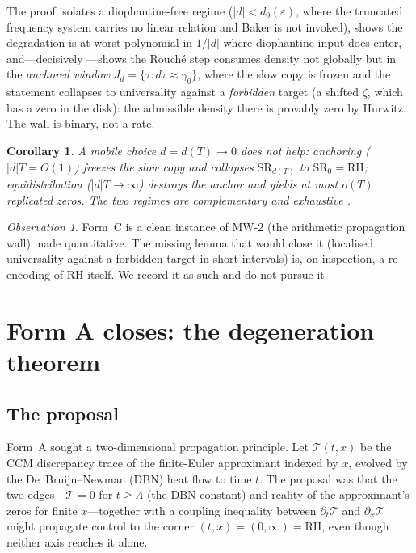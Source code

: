 \documentclass[11pt]{amsart}
\newtheorem{corollary}[theorem]{Corollary}
\theoremstyle{definition}
\theoremstyle{remark}
\newtheorem{observation}[theorem]{Observation}
\newcommand{\RH}{\mathrm{RH}}
\begin{document}
The proof \cite[]{P40} isolates a diophantine-free regime
($|d|<d_0(\varepsilon)$, where the truncated frequency system carries no
linear relation and Baker is not invoked), shows the degradation is at worst
polynomial in $1/|d|$ where diophantine input does enter, and---decisively
---shows the Rouch\'e step consumes density not globally but in the
\emph{anchored window} $J_d=\{\tau:d\tau\approx\gamma_0\}$, where the slow
copy is frozen and the statement collapses to universality against a
\emph{forbidden} target (a shifted $\zeta$, which has a zero in the disk):
the admissible density there is provably zero by Hurwitz. The wall is
binary, not a rate.

\begin{corollary}
A mobile choice $d=d(T)\to0$ does not help: anchoring
($|d|T=O(1)$) freezes the slow copy and collapses $\mathrm{SR}_{d(T)}$ to
$\mathrm{SR}_0=\RH$; equidistribution ($|d|T\to\infty$) destroys the anchor
and yields at most $o(T)$ replicated zeros. The two regimes are
complementary and exhaustive \cite[Lem.~6.1]{P40}.
\end{corollary}

\begin{observation}
Form~C is a clean instance of MW-2 (the arithmetic propagation wall) made
quantitative. The missing lemma that would close it (localised universality
against a forbidden target in short intervals) is, on inspection, a
re-encoding of RH itself. We record it as such and do not pursue it.
\end{observation}

\section{Form A closes: the degeneration theorem}\label{sec:formA}

\subsection{The proposal}
Form~A sought a two-dimensional propagation principle. Let
$\mathcal{T}(t,x)$ be the CCM discrepancy trace of the finite-Euler
approximant indexed by $x$, evolved by the De~Bruijn--Newman (DBN) heat
flow to time $t$. The proposal \cite[Prob.~6.2]{P41} was that the two
edges---$\mathcal{T}=0$ for $t\ge\Lambda$ (the DBN constant) and reality of
the approximant's zeros for finite $x$---together with a coupling
inequality between $\partial_t\mathcal{T}$ and $\partial_x\mathcal{T}$
might propagate control to the corner $(t,x)=(0,\infty)=\RH$, even though
neither axis reaches it alone.
\end{document}
